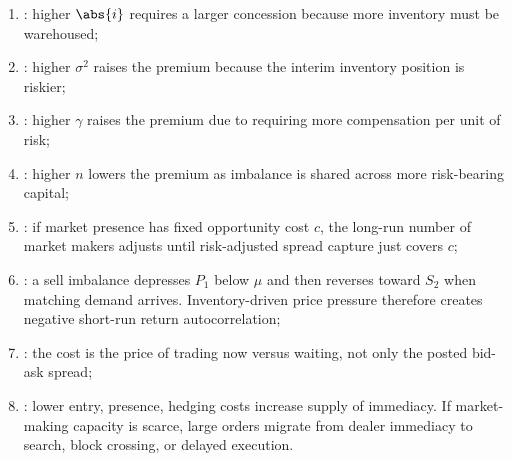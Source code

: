 \begin{model}
\par\smallskip\noindent{}
\begin{enumerate}[label=\roman*.]
\setlength{\itemsep}{0pt}
\item {}: higher $\abs{i}$ requires a larger concession because more inventory must be warehoused;
\item {}: higher $\sigma^2$ raises the premium because the interim inventory position is riskier;
\item {}: higher $\gamma$ raises the premium due to requiring more compensation per unit of risk;
\item {}: higher $n$ lowers the premium as imbalance is shared across more risk-bearing capital;
\item {}: if market presence has fixed opportunity cost $c$, the long-run number of market makers adjusts until risk-adjusted spread capture just covers $c$;
\item {}: a sell imbalance depresses $P_1$ below $\mu$ and then reverses toward $S_2$ when matching demand arrives. Inventory-driven price pressure therefore creates negative short-run return autocorrelation;
\item {}: the cost is the price of trading now versus waiting, not only the posted bid-ask spread;
\item {}: lower entry, presence, hedging costs increase supply of immediacy. If market-making capacity is scarce, large orders migrate from dealer immediacy to search, block crossing, or delayed execution.
\end{enumerate}


\end{model}
